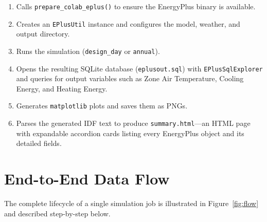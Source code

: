 \documentclass[12pt, a4paper]{article}
\begin{document}
\begin{enumerate}[nosep]
  \item Calls \texttt{prepare\_colab\_eplus()} to ensure the EnergyPlus binary is available.
  \item Creates an \texttt{EPlusUtil} instance and configures the model, weather, and output directory.
  \item Runs the simulation (\texttt{design\_day} or \texttt{annual}).
  \item Opens the resulting SQLite database (\texttt{eplusout.sql}) with \texttt{EPlusSqlExplorer} and queries for output variables such as Zone Air Temperature, Cooling Energy, and Heating Energy.
  \item Generates \texttt{matplotlib} plots and saves them as PNGs.
  \item Parses the generated IDF text to produce \texttt{summary.html}---an HTML page with expandable accordion cards listing every EnergyPlus object and its detailed fields.
\end{enumerate}

\section{End-to-End Data Flow}

The complete lifecycle of a single simulation job is illustrated in Figure~\ref{fig:flow} and described step-by-step below.
\end{document}
